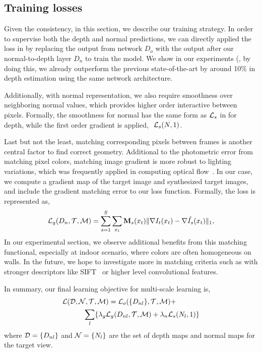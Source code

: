 \subsection{Training losses}
\label{sub:training_losses}
\vspace{-0.3\baselineskip}

Given the consistency, in this section, we describe our training strategy. In order to supervise both the depth and normal predictions, we can directly applied the loss in  by replacing the output from network $D_o$ with the output after our normal-to-depth layer $D_n$ to train the model. We show in our experiments (, by doing this, we already outperform the previous state-of-the-art by around 10$\%$ in depth estimation using the same network architecture.

Additionally, with normal representation, we also require smoothness over neighboring normal values, which provides higher order interactive between pixels. Formally, the smoothness for normal has the same form as ${\mathcal L}_{s}$ in  for depth, while the first order gradient is applied, \ie $~{\mathcal L}_{s}(N, 1)$. 

Last but not the least, matching corresponding pixels between frames is another central factor to find correct geometry. Additional to the photometric error from matching pixel colors, matching image gradient is more robust to lighting variations, which was frequently applied in computing optical flow~\cite{li2017pyramidal}. 
In our case, we compute a gradient map of the target image and synthesized target images, and include the gradient matching error to our loss function. Formally, the loss is represented as,
\begin{equation}
\label{equ:gradient}
{\mathcal L}_{g}(D_n, {\mathcal T}, {\mathcal M}) = \sum_{s=1}^{S}\sum_{x_t}{\mathbf M}_s(x_t)\|\nabla I_t(x_t) - \nabla \hat{I_s}(x_t)\|_1, \nonumber
\end{equation}
In our experimental section, we observe additional benefits from this matching functional, especially at indoor scenario, where colors are often homogeneous on walls.
In the future, we hope to investigate more in matching criteria such as with stronger descriptors like SIFT~\cite{liu2011sift} or higher level convolutional features.

In summary, our final learning objective for multi-scale learning is,
\begin{align}
\label{eq:full_loss}
&{\mathcal L}({\mathcal D}, {\mathcal N}, {\mathcal T}, {\mathcal M}) = {\mathcal L}_{o}(\{D_{nl}\}, {\mathcal T}, {\mathcal M}) + \nonumber\\
&\text{~~~~~~~~~}\sum_l\{\lambda_g{\mathcal L}_{g}(D_{nl},{\mathcal T},{\mathcal M}) + \lambda_n{\mathcal L}_{s}(N_l, 1)\}
\end{align}
where ${\mathcal D} = \{D_{nl}\}$ and ${\mathcal N} = \{N_{l}\}$ are the set of depth maps and normal maps for the target view.

